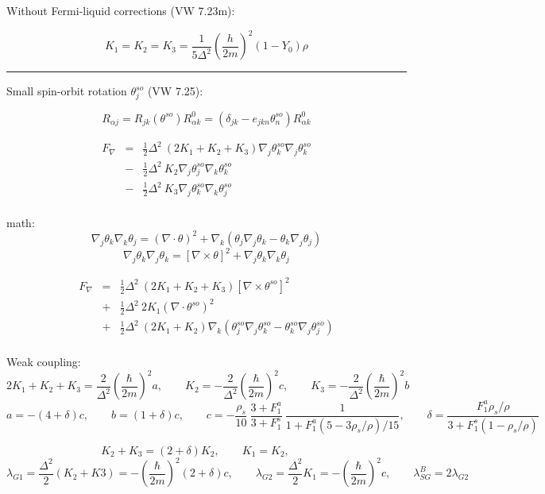 \documentclass[a4paper]{article}
\begin{document}
Without Fermi-liquid corrections (VW 7.23m):

$$
K_1=K_2=K_3 = \frac{1}{5\Delta^2} \left(\frac{h}{2m}\right)^2 (1-Y_0)\rho
$$

\eject

\hrule
\medskip

Small spin-orbit rotation $\theta^{so}_j$ (VW 7.25):

$$
R_{\alpha j} = R_{jk}(\theta^{so}) R^0_{\alpha k} =
(\delta_{jk} - e_{jkn}\theta^{so}_n) R^0_{\alpha k}
$$

\begin{eqnarray*}
F_\nabla
&=& \frac12 \Delta^2\ (2 K_1 + K_2 + K_3)
\nabla_j\theta^{so}_k \nabla_j\theta^{so}_k\\
&-& \frac12 \Delta^2\ K_2
\nabla_j\theta^{so}_j \nabla_k\theta^{so}_k\\
&-& \frac12 \Delta^2\ K_3
\nabla_j\theta^{so}_k \nabla_k\theta^{so}_j\\
\end{eqnarray*}

math:
$$
\nabla_j \theta_k \nabla_k \theta_j = (\nabla \cdot \theta)^2 +
\nabla_k(\theta_j \nabla_j\theta_k - \theta_k \nabla_j\theta_j)
$$
$$
 \nabla_j \theta_k \nabla_j \theta_k = [\nabla \times \theta]^2 + \nabla_j \theta_k \nabla_k \theta_j
$$

\begin{eqnarray*}
F_\nabla
&=& \frac12 \Delta^2\ (2 K_1 + K_2 + K_3)
[\nabla \times \theta^{so}]^2\\
&+& \frac12 \Delta^2\  2K_1
(\nabla \cdot \theta^{so})^2\\
&+& \frac12 \Delta^2\ (2 K_1+K_2)
\nabla_k(\theta^{so}_j \nabla_j\theta^{so}_k - \theta^{so}_k \nabla_j\theta^{so}_j)\\
\end{eqnarray*}

Weak coupling:
$$
2 K_1 + K_2 + K_3 = \frac{2}{\Delta^2}\left(\frac{\hbar}{2m}\right)^2 a,
\qquad
K_2 = -\frac{2}{\Delta^2}\left(\frac{\hbar}{2m}\right)^2 c,
\qquad
K_3 = -\frac{2}{\Delta^2}\left(\frac{\hbar}{2m}\right)^2 b
$$
$$
a=-(4+\delta)c,\qquad
b= (1+\delta)c,\qquad
c=-\frac{\rho_s}{10}
\ \frac{3+F_1^a}{3+F_1^s}
\ \frac{1}{1+F_1^a(5-3\rho_s/\rho)/15}
,\qquad
\delta = \frac{F_1^a \rho_s/\rho}{3+F_1^s(1-\rho_s/\rho)}
$$

$$
K_2+K_3 = (2+\delta)K_2,\qquad
K_1=K_2,\qquad
$$
$$
\lambda_{G1} = \frac{\Delta^2}{2}(K_2+K3) = -\left(\frac{\hbar}{2m}\right)^2 (2+\delta) c,\qquad
\lambda_{G2} = \frac{\Delta^2}{2}K_1 = -\left(\frac{\hbar}{2m}\right)^2 c,\qquad
\lambda_{SG}^B = 2\lambda_{G2}
$$
\end{document}
